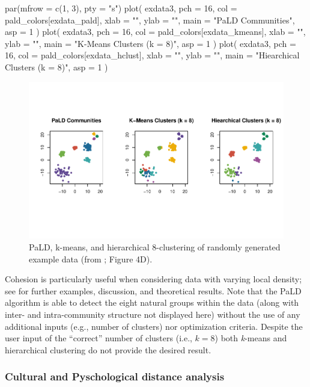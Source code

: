 \begin{Schunk}
\begin{Sinput}
par(mfrow = c(1, 3), pty = "s")
plot(
  exdata3,
  pch = 16,
  col = pald_colors[exdata_pald],
  xlab = "",
  ylab = "",
  main = "PaLD Communities",
  asp = 1
)
plot(
  exdata3,
  pch = 16,
  col = pald_colors[exdata_kmeans],
  xlab = "",
  ylab = "",
  main = "K-Means Clusters (k = 8)",
  asp = 1
)
plot(
  exdata3,
  pch = 16,
  col = pald_colors[exdata_hclust],
  xlab = "",
  ylab = "",
  main = "Hiearchical Clusters (k = 8)",
  asp = 1
)
\end{Sinput}
\begin{figure}[H]
\includegraphics[width=5.5in,trim=0in 1in 0in 0.8in,clip]{dagostino-mcgowan_files/figure-latex/fig5-1} \caption[PaLD, k-means, and hierarchical 8-clustering of randomly generated example data (from \citet{berenhaut2022social}]{PaLD, k-means, and hierarchical 8-clustering of randomly generated example data (from \citet{berenhaut2022social}; Figure 4D).}\label{fig:fig5}
\end{figure}
\end{Schunk}

Cohesion is particularly useful when considering data with varying local
density; see \citet{berenhaut2022social} for further examples,
discussion, and theoretical results. Note that the PaLD algorithm is
able to detect the eight natural groups within the data (along with
inter- and intra-community structure not displayed here) without the use
of any additional inputs (e.g., number of clusters) nor optimization
criteria. Despite the user input of the ``correct'' number of clusters
(i.e., \(k = 8\)) both \emph{k}-means and hierarchical clustering do not
provide the desired result.

\hypertarget{cultural-and-pyschological-distance-analysis}{%
\subsubsection{Cultural and Pyschological distance
analysis}\label{cultural-and-pyschological-distance-analysis}}

